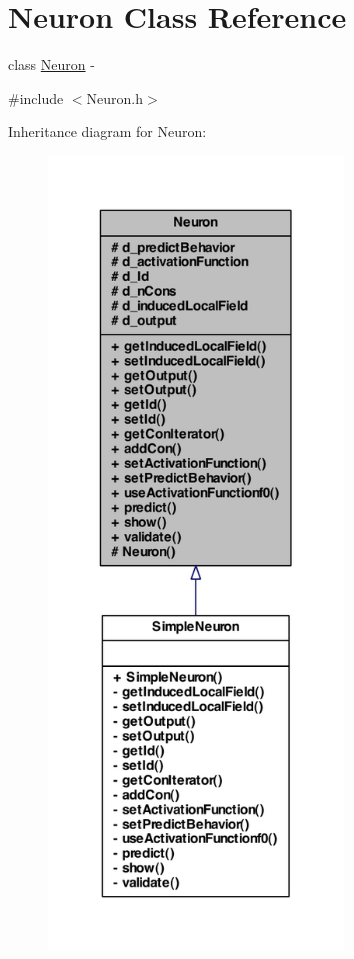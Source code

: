 \hypertarget{class_neuron}{
\section{Neuron Class Reference}
\label{class_neuron}
}


class \hyperlink{class_neuron}{Neuron} -\/  




{\ttfamily \#include $<$Neuron.h$>$}



Inheritance diagram for Neuron:
\nopagebreak
\begin{figure}[H]
\begin{center}
\leavevmode
\includegraphics[width=222pt]{class_neuron__inherit__graph}
\end{center}
\end{figure}
